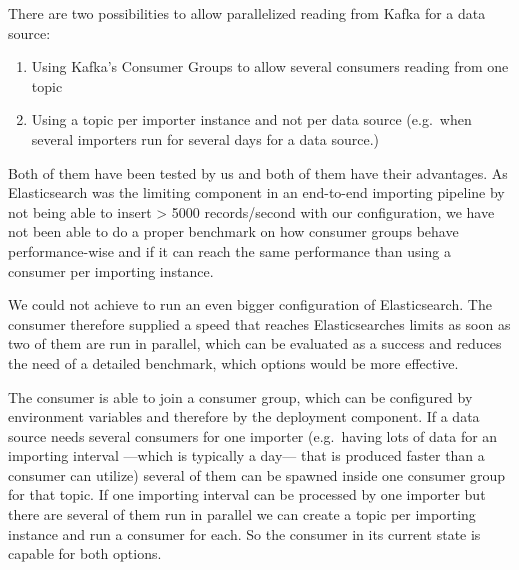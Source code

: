 There are two possibilities to allow parallelized reading from Kafka for
a data source:

\begin{enumerate}
\def\labelenumi{\arabic{enumi}.}
\tightlist
\item
  Using Kafka's Consumer Groups to allow several consumers reading from
  one topic
\item
  Using a topic per importer instance and not per data source (e.g.~when
  several importers run for several days for a data source.)
\end{enumerate}

Both of them have been tested by us and both of them have their
advantages. As Elasticsearch was the limiting component in an end-to-end
importing pipeline by not being able to insert \textgreater{} 5000
records/second with our configuration, we have not been able to do a
proper benchmark on how consumer groups behave performance-wise and if
it can reach the same performance than using a consumer per importing
instance.

We could not achieve to run an even bigger configuration of
Elasticsearch. The consumer therefore supplied a speed that reaches
Elasticsearches limits as soon as two of them are run in parallel, which
can be evaluated as a success and reduces the need of a detailed
benchmark, which options would be more effective.

The consumer is able to join a consumer group, which can be configured
by environment variables and therefore by the deployment component. If a
data source needs several consumers for one importer (e.g.~having lots
of data for an importing interval ---which is typically a day--- that is
produced faster than a consumer can utilize) several of them can be
spawned inside one consumer group for that topic. If one importing
interval can be processed by one importer but there are several of them
run in parallel we can create a topic per importing instance and run a
consumer for each. So the consumer in its current state is capable for
both options.
